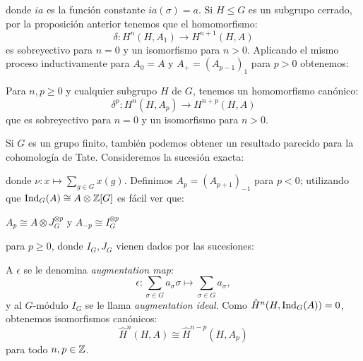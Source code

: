 \documentclass[a4paper,12pt, leqno]{article}
\begin{document}
	donde $ia$ es la función constante $ia(\sigma)=a$. Si $H\leq G$ es un subgrupo cerrado, por la proposición anterior tenemos que el homomorfismo:
	\begin{equation*}
	\delta: H^n(H,A_1) \rightarrow H^{n+1}(H,A)
	\end{equation*} 
	es sobreyectivo para $n=0$ y un isomorfismo para $n>0$. Aplicando el mismo proceso inductivamente para $A_0 = A$ y $A_+=(A_{p-1})_1$ para $p>0$ obtenemos:
	\begin{prop}\label{dimsh}
		Para $n,p \geq0$ y cualquier subgrupo $H$ de $G$, tenemos un homomorfismo canónico:\begin{equation*}
		\delta^p: H^n(H,A_p) \rightarrow H^{n+p}(H,A)
		\end{equation*}
		que es sobreyectivo para $n=0$ y un isomorfismo para $n>0$.
	\end{prop}
	
	Si $G$ es un grupo finito, también podemos obtener un resultado parecido para la cohomología de Tate. Consideremos la sucesión exacta:
	\begin{center}
	\end{center}
	donde $\nu:x \mapsto \sum_{g \in G} x(g)$. Definimos $A_p=(A_{p+1})_{-1}$ para $p<0$; utilizando que $\mathrm{Ind}_G (A) \cong A \otimes \mathbb{Z}[G]$ es fácil ver que:
	\begin{center}
		$A_p \cong A \otimes J_G^{\otimes p}$ y $A_{-p}\cong I_G^{\otimes p}$
	\end{center}
	para $p\geq 0$, donde $I_G,J_G$ vienen dados por las sucesiones:
	\begin{center}
	\end{center}
	A $\epsilon$ se le denomina \textit{augmentation map}:
	\begin{equation*}
	\epsilon: \sum_{\sigma \in G} a_{\sigma} \sigma \mapsto \sum_{\sigma \in G} a_{\sigma},
	\end{equation*}
	y al $G$-módulo $I_G$ se le llama \textit{augmentation ideal}. Como $\hat{H}^n(H,\mathrm{Ind}_G (A))=0$, obtenemos isomorfismos canónicos:
	\begin{equation*}
	\hat{H}^n(H,A)\cong \hat{H}^{n-p}(H,A_p)
	\end{equation*}
	para todo $n,p \in \mathbb{Z}$.
	
\end{document}
